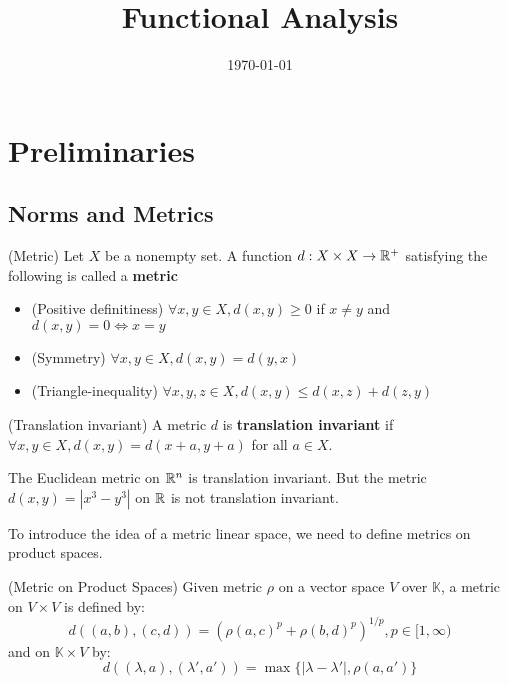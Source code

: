 \documentclass{article}
\title{Functional Analysis}
\date{\today}
\begin{document}
\section{Preliminaries}   

\subsection{Norms and Metrics}

\begin{defn}
(Metric) Let $X$ be a nonempty set. 
A function $d: X \times X \to \mathbb{R}^+$ satisfying the following is called a  \textbf{metric}  

\begin{itemize}
    \item (Positive definitiness) $\forall x,y \in X, d(x,y)\geq 0$ if $x \neq y$ and $d(x,y)=0 \iff x=y$
    \item (Symmetry) $\forall x,y \in X, d(x,y)=d(y,x)$
    \item (Triangle-inequality) $\forall x,y,z \in X, d(x,y) \leq d(x,z) + d(z,y)$
\end{itemize}

\end{defn}
\begin{defn}
    (Translation invariant) A metric $d$ is \textbf{translation invariant} if $\forall x,y \in X, d(x,y)=d(x+a,y+a)$ for all $a \in X$.
\end{defn} 

\begin{eg}
    The Euclidean metric on $\mathbb{R}^n$ is translation invariant.  
    But the metric $d(x,y)=|x^3-y^3|$ on $\mathbb{R}$ is not translation invariant.
\end{eg}

To introduce the idea of a metric linear space, we need to define metrics on product spaces.  

\begin{defn} (Metric on Product Spaces)
    Given metric $\rho$ on a vector space $V$ over $\mathbb{K}$, a metric on $V \times V$ is defined by:  
    \begin{equation*}
        d((a,b),(c,d)) = (\rho(a,c)^p+\rho(b,d)^p)^{1/p}, p \in [1,\infty)
    \end{equation*}  
    and on $\mathbb{K} \times V$ by:
    \begin{equation*}
        d((\lambda, a),(\lambda',a')) = \max \{|\lambda-\lambda'|, \rho (a, a')\}
    \end{equation*}
\end{defn}
\end{document}
